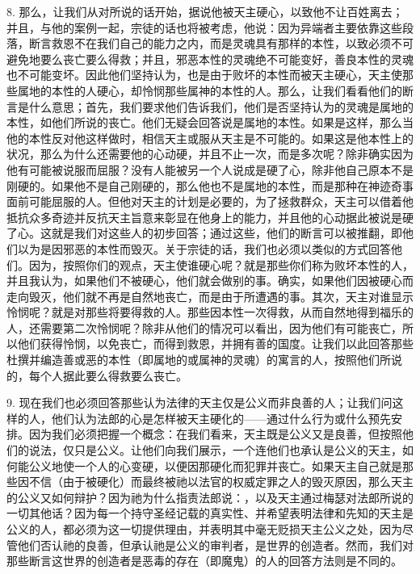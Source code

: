 8. 那么，让我们从对所说的话开始，据说他被天主硬心，以致他不让百姓离去；并且，与他的案例一起，宗徒的话也将被考虑，他说：因为异端者主要依靠这些段落，断言救恩不在我们自己的能力之内，而是灵魂具有那样的本性，以致必须不可避免地要么丧亡要么得救；并且，邪恶本性的灵魂绝不可能变好，善良本性的灵魂也不可能变坏。因此他们坚持认为，也是由于败坏的本性而被天主硬心，天主使那些属地的本性的人硬心，却怜悯那些属神的本性的人。那么，让我们看看他们的断言是什么意思；首先，我们要求他们告诉我们，他们是否坚持认为的灵魂是属地的本性，如他们所说的丧亡。他们无疑会回答说是属地的本性。如果是这样，那么当他的本性反对他这样做时，相信天主或服从天主是不可能的。如果这是他本性上的状况，那么为什么还需要他的心动硬，并且不止一次，而是多次呢？除非确实因为他有可能被说服而屈服？没有人能被另一个人说成是硬了心，除非他自己原本不是刚硬的。如果他不是自己刚硬的，那么他也不是属地的本性，而是那种在神迹奇事面前可能屈服的人。但他对天主的计划是必要的，为了拯救群众，天主可以借着他抵抗众多奇迹并反抗天主旨意来彰显在他身上的能力，并且他的心动据此被说是硬了心。这就是我们对这些人的初步回答；通过这些，他们的断言可以被推翻，即他们以为是因邪恶的本性而毁灭。关于宗徒的话，我们也必须以类似的方式回答他们。因为，按照你们的观点，天主使谁硬心呢？就是那些你们称为败坏本性的人，并且我认为，如果他们不被硬心，他们就会做别的事。确实，如果他们因被硬心而走向毁灭，他们就不再是自然地丧亡，而是由于所遭遇的事。其次，天主对谁显示怜悯呢？就是对那些将要得救的人。那些因本性一次得救，从而自然地得到福乐的人，还需要第二次怜悯呢？除非从他们的情况可以看出，因为他们有可能丧亡，所以他们获得怜悯，以免丧亡，而得到救恩，并拥有善的国度。让我们以此回答那些杜撰并编造善或恶的本性（即属地的或属神的灵魂）的寓言的人，按照他们所说的，每个人据此要么得救要么丧亡。\par

9. 现在我们也必须回答那些认为法律的天主仅是公义而非良善的人；让我们问这样的人，他们认为法郎的心是怎样被天主硬化的——通过什么行为或什么预先安排。因为我们必须把握一个概念：在我们看来，天主既是公义又是良善，但按照他们的说法，仅只是公义。让他们向我们展示，一个连他们也承认是公义的天主，如何能公义地使一个人的心变硬，以便因那硬化而犯罪并丧亡。如果天主自己就是那些因不信（由于被硬化）而最终被祂以法官的权威定罪之人的毁灭原因，那么天主的公义又如何辩护？因为祂为什么指责法郎说：，以及天主通过梅瑟对法郎所说的一切其他话？因为每一个持守圣经记载的真实性、并希望表明法律和先知的天主是公义的人，都必须为这一切提供理由，并表明其中毫无贬损天主公义之处，因为尽管他们否认祂的良善，但承认祂是公义的审判者，是世界的创造者。然而，我们对那些断言这世界的创造者是恶毒的存在（即魔鬼）的人的回答方法则是不同的。\par

